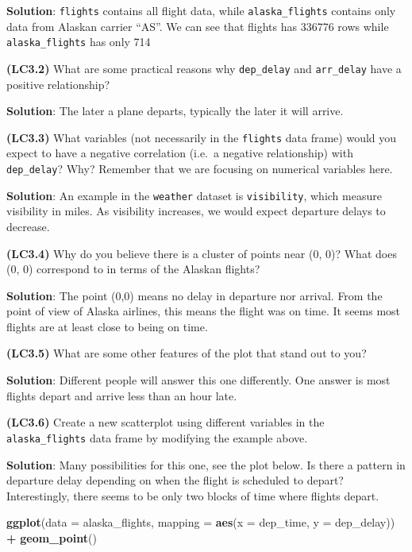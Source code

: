 \documentclass[12pt,]{krantz}
\makeatletter
\newenvironment{Shaded}{\begin{snugshade}}{\end{snugshade}}
\newcommand{\KeywordTok}[1]{\textcolor[rgb]{0.27,0.27,0.27}{\textbf{#1}}}
\newcommand{\DataTypeTok}[1]{\textcolor[rgb]{0.27,0.27,0.27}{#1}}
\newcommand{\StringTok}[1]{\textcolor[rgb]{0.5,0.5,0.5}{#1}}
\newcommand{\OperatorTok}[1]{\textcolor[rgb]{0.43,0.43,0.43}{\textbf{#1}}}
\newcommand{\NormalTok}[1]{#1}
\newenvironment{kframe}{%
\medskip{}
\setlength{\fboxsep}{.8em}
 \def\at@end@of@kframe{}%
 \ifinner\ifhmode%
  \def\at@end@of@kframe{\end{minipage}}%
  \begin{minipage}{\columnwidth}%
 \fi\fi%
 \def\FrameCommand##1{\hskip\@totalleftmargin \hskip-\fboxsep
 \colorbox{shadecolor}{##1}\hskip-\fboxsep
     \hskip-\linewidth \hskip-\@totalleftmargin \hskip\columnwidth}%
 \MakeFramed {\advance\hsize-\width
   \@totalleftmargin\z@ \linewidth\hsize
   \@setminipage}}%
 {\par\unskip\endMakeFramed%
 \at@end@of@kframe}
\renewenvironment{Shaded}{\begin{kframe}}{\end{kframe}}
\makeatother
\begin{document}
\textbf{Solution}: \texttt{flights} contains all flight data, while
\texttt{alaska\_flights} contains only data from Alaskan carrier ``AS''.
We can see that flights has 336776 rows while \texttt{alaska\_flights}
has only 714

\textbf{(LC3.2)} What are some practical reasons why \texttt{dep\_delay}
and \texttt{arr\_delay} have a positive relationship?

\textbf{Solution}: The later a plane departs, typically the later it
will arrive.

\textbf{(LC3.3)} What variables (not necessarily in the \texttt{flights}
data frame) would you expect to have a negative correlation (i.e.~a
negative relationship) with \texttt{dep\_delay}? Why? Remember that we
are focusing on numerical variables here.

\textbf{Solution}: An example in the \texttt{weather} dataset is
\texttt{visibility}, which measure visibility in miles. As visibility
increases, we would expect departure delays to decrease.

\textbf{(LC3.4)} Why do you believe there is a cluster of points near
(0, 0)? What does (0, 0) correspond to in terms of the Alaskan flights?

\textbf{Solution}: The point (0,0) means no delay in departure nor
arrival. From the point of view of Alaska airlines, this means the
flight was on time. It seems most flights are at least close to being on
time.

\textbf{(LC3.5)} What are some other features of the plot that stand out
to you?

\textbf{Solution}: Different people will answer this one differently.
One answer is most flights depart and arrive less than an hour late.

\textbf{(LC3.6)} Create a new scatterplot using different variables in
the \texttt{alaska\_flights} data frame by modifying the example above.

\textbf{Solution}: Many possibilities for this one, see the plot below.
Is there a pattern in departure delay depending on when the flight is
scheduled to depart? Interestingly, there seems to be only two blocks of
time where flights depart.

\begin{Shaded}
\begin{Highlighting}[]
\KeywordTok{ggplot}\NormalTok{(}\DataTypeTok{data =}\NormalTok{ alaska_flights, }\DataTypeTok{mapping =} \KeywordTok{aes}\NormalTok{(}\DataTypeTok{x =}\NormalTok{ dep_time, }\DataTypeTok{y =}\NormalTok{ dep_delay)) }\OperatorTok{+}
\StringTok{  }\KeywordTok{geom_point}\NormalTok{()}
\end{Highlighting}
\end{Shaded}
\end{document}
